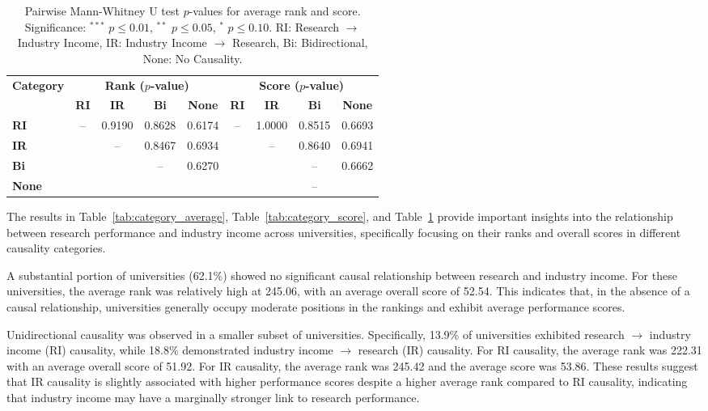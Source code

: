 \documentclass[a4paper, conference]{IEEEtran}
\begin{document}
\begin{table}
	\centering
	\caption{Pairwise Mann-Whitney U test $p$-values for average rank and score. Significance: $^{***}$ $p \leq 0.01$, $^{**}$ $p \leq 0.05$, $^{*}$ $p \leq 0.10$. RI: Research $\rightarrow$ Industry Income, IR: Industry Income $\rightarrow$ Research, Bi: Bidirectional, None: No Causality.}
	\label{tab:significance}
	\begin{scriptsize}
		\begin{tabular}{|l|cccc|cccc|}
			\hline
			\multirow{2}{*}{\textbf{Category}} 
			& \multicolumn{4}{c|}{\textbf{Rank ($p$-value)}} 
			& \multicolumn{4}{c|}{\textbf{Score ($p$-value)}} \\ \cline{2-9}
			& \textbf{RI} & \textbf{IR} & \textbf{Bi} & \textbf{None} 
			& \textbf{RI} & \textbf{IR} & \textbf{Bi} & \textbf{None} \\ \hline
			\textbf{RI}   
			&  --    & 0.9190 & 0.8628 & 0.6174 
			&  --    & 1.0000 & 0.8515 & 0.6693 \\ \hline
			\textbf{IR}   
			&        &  --    & 0.8467 & 0.6934 
			&        &  --    & 0.8640 & 0.6941 \\ \hline
			\textbf{Bi}   
			&        &       &  --    & 0.6270 
			&        &       &  --    & 0.6662 \\ \hline
			\textbf{None} 
			&        &       &       
			&        &       &       &  --    \\ \hline
		\end{tabular}
	\end{scriptsize}
\end{table}



The results in Table~\ref{tab:category_average}, Table~\ref{tab:category_score}, and Table~\ref{tab:significance} provide important insights into the relationship between research performance and industry income across universities, specifically focusing on their ranks and overall scores in different causality categories.

A substantial portion of universities (62.1\%) showed no significant causal relationship between research and industry income. For these universities, the average rank was relatively high at 245.06, with an average overall score of 52.54. This indicates that, in the absence of a causal relationship, universities generally occupy moderate positions in the rankings and exhibit average performance scores.

Unidirectional causality was observed in a smaller subset of universities. Specifically, 13.9\% of universities exhibited research $\rightarrow$ industry income (RI) causality, while 18.8\% demonstrated industry income $\rightarrow$ research (IR) causality. For RI causality, the average rank was 222.31 with an average overall score of 51.92. For IR causality, the average rank was 245.42 and the average score was 53.86. These results suggest that IR causality is slightly associated with higher performance scores despite a higher average rank compared to RI causality, indicating that industry income may have a marginally stronger link to research performance.
\end{document}
